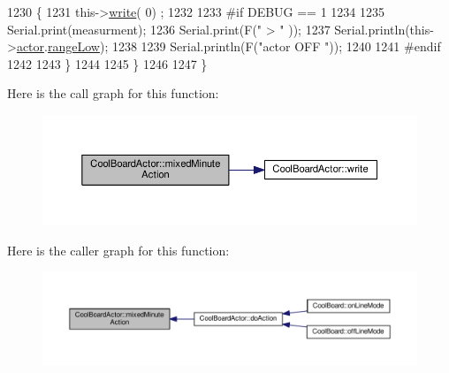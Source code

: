 \begin{DoxyCode}
1230             \{
1231                 this->\hyperlink{class_cool_board_actor_a958786ff01ea1056ee72c72d439f86da}{write}( 0) ;
1232             
1233 \textcolor{preprocessor}{            #if DEBUG == 1 }
1234 
1235                 Serial.print(measurment);
1236                 Serial.print(F(\textcolor{stringliteral}{" > "} ));
1237                 Serial.println(this->\hyperlink{class_cool_board_actor_a8f190db9f7a39fddbcef7f152da970e9}{actor}.\hyperlink{struct_cool_board_actor_1_1state_a43f891c9fb3bb63575c27cec860de55a}{rangeLow});
1238 
1239                 Serial.println(F(\textcolor{stringliteral}{"actor OFF "}));
1240 
1241 \textcolor{preprocessor}{            #endif  }
1242                 
1243             \}
1244 
1245     \}
1246 
1247 \}
\end{DoxyCode}
Here is the call graph for this function\+:\nopagebreak
\begin{figure}[H]
\begin{center}
\leavevmode
\includegraphics[width=350pt]{dc/d69/class_cool_board_actor_a2b8a79a27288d5246e3e3860ae76770d_cgraph}
\end{center}
\end{figure}
Here is the caller graph for this function\+:\nopagebreak
\begin{figure}[H]
\begin{center}
\leavevmode
\includegraphics[width=350pt]{dc/d69/class_cool_board_actor_a2b8a79a27288d5246e3e3860ae76770d_icgraph}
\end{center}
\end{figure}
\mbox{\label{class_cool_board_actor_a00b29c4abf0388551aa6812372113cf1}} 
